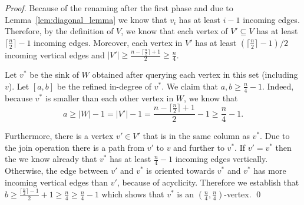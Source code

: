 \documentclass[runningheads,a4paper]{llncs}
\newcommand{\AT}[1]{\marginpar{\parbox{3.6cm}{{\small {\bf AT:} #1}}}} %
\newcommand{\indegree}{refined in-degree\xspace}
\newcommand{\join}{\mbox{join}\xspace}
\begin{document}
\begin{proof}
Because of the renaming after the first phase and due to Lemma~\ref{lem:diagonal_lemma} we know that $v_i$ has at least $i-1$ incoming edges. 
Therefore, by the definition of $V$, we know that each vertex of $V'\subseteq V$ has at least $\lceil \frac{n}{2} \rceil - 1$ incoming edges.
Moreover, each vertex in $V'$ has at least $(\lceil \frac{n}{2}\rceil-1)/2$ incoming vertical edges and $|V'| \geq \frac{n-\lceil \frac{n}{2}\rceil + 1}{2} \geq \frac{n}{4}$. 

Let $v^*$ be the sink of $W$ obtained after querying each vertex in this set (including $v$). Let $[a,b]$ be the \indegree of $v^*$. We claim that $a, b \geq \frac{n}{4} - 1$. 
Indeed, because $v^*$ is smaller than each other vertex in $W$, we know that $$a \geq |W|-1 = |V'|-1 = \frac{n-\lceil \frac{n}{2}\rceil + 1}{2} - 1 \geq \frac{n}{4} - 1.$$


Furthermore, there is a vertex $v' \in V'$ that is in the same column as $v^*$. Due to the \join operation there is a path from $v'$ to $v$ and further to $v^*$. 
If $v'=v^*$ then the we know already that $v^*$ has at least $\frac{n}{4} - 1$ incoming edges vertically.
Otherwise,  the edge between $v'$ and $v^*$ is oriented towards $v^*$ and $v^*$ has more incoming vertical edges than $v'$, because of acyclicity. Therefore we establish that $b \geq \frac{\lceil \frac{n}{2}\rceil-1}{2} + 1 \geq \frac{n}{4} \geq \frac{n}{4} - 1$ which shows that $v^*$ is an $(\frac{n}{4}, \frac{n}{4})$-vertex. \qed


   

\end{proof}
\end{document}
